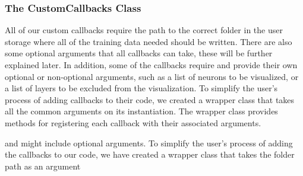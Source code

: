 \subsubsection{The CustomCallbacks Class}

All of our custom callbacks require the path to the correct folder in the user storage where all of the training data needed should be written. There are also some optional arguments that all callbacks can take, these will be further explained later. In addition, some of the callbacks require and provide their own optional or non-optional arguments, such as a list of neurons to be visualized, or a list of layers to be excluded from the visualization. To simplify the user's process of adding callbacks to their code, we created a wrapper class that takes all the common arguments on its instantiation. The wrapper class provides methods for registering each callback with their associated arguments.



and might include optional arguments. To simplify the user's process of adding the callbacks to our code, we have created a wrapper class that takes the folder path as an argument 


